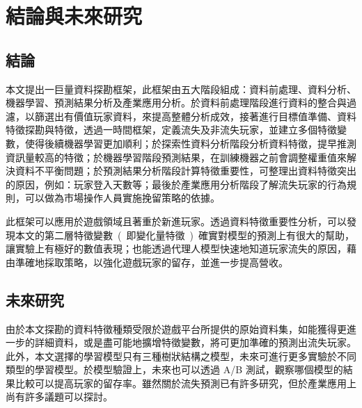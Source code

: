 \chapter{結論與未來研究}
\label{cha:Conclusions}

\section{結論}

本文提出一巨量資料探勘框架，此框架由五大階段組成：資料前處理、資料分析、機器學習、預測結果分析及產業應用分析。於資料前處理階段進行資料的整合與過濾，以篩選出有價值玩家資料，來提高整體分析成效，接著進行目標值準備、資料特徵探勘與特徵，透過一時間框架，定義流失及非流失玩家，並建立多個特徵變數，使得後續機器學習更加順利；於探索性資料分析階段分析資料特徵，提早推測資訊量較高的特徵；於機器學習階段預測結果，在訓練機器之前會調整權重值來解決資料不平衡問題；於預測結果分析階段計算特徵重要性，可整理出資料特徵突出的原因，例如：玩家登入天數等；最後於產業應用分析階段了解流失玩家的行為規則，可以做為市場操作人員實施挽留策略的依據。

此框架可以應用於遊戲領域且著重於新進玩家。透過資料特徵重要性分析，可以發現本文的第二層特徵變數\ (\ 即變化量特徵\ )\ 確實對模型的預測上有很大的幫助，讓實驗上有極好的數值表現；也能透過代理人模型快速地知道玩家流失的原因，藉由準確地採取策略，以強化遊戲玩家的留存，並進一步提高營收。

\section{未來研究}

由於本文探勘的資料特徵種類受限於遊戲平台所提供的原始資料集，如能獲得更進一步的詳細資料，或是盡可能地擴增特徵變數，將可更加準確的預測出流失玩家。此外，本文選擇的學習模型只有三種樹狀結構之模型，未來可進行更多實驗於不同類型的學習模型。於模型驗證上，未來也可以透過 A/B 測試，觀察哪個模型的結果比較可以提高玩家的留存率。雖然關於流失預測已有許多研究，但於產業應用上尚有許多議題可以探討。